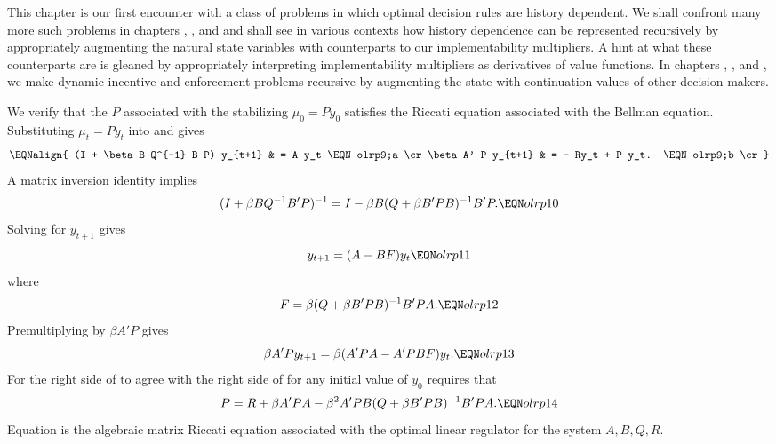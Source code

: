   This chapter is our first encounter with  a class of problems
in which optimal decision rules are history dependent. We shall
confront many more such problems in chapters ,
,
and  and shall see in various contexts how history
dependence can be represented recursively by
appropriately augmenting the natural state variables with
counterparts to our implementability multipliers.  A hint at what
these counterparts are is gleaned by appropriately interpreting
implementability multipliers as derivatives of value functions. In
chapters , , and , we make dynamic
incentive and enforcement problems recursive  by augmenting the
state with continuation values of other decision
makers.
%

\label{appAblkstack}%
We verify that the  $P$ associated with the stabilizing $\mu_0 = P
y_0$ satisfies the Riccati equation associated with the Bellman
equation. Substituting $\mu_t = P y_t$ into  and
 gives
$$\EQNalign{ (I + \beta   B   Q^{-1}   B P) y_{t+1}
   & = A y_t \EQN olrp9;a \cr
    \beta A' P y_{t+1} & = - Ry_t + P y_t. \EQN olrp9;b \cr } $$
A matrix inversion identity implies
$$ (I + \beta   B   Q^{-1}   B' P)^{-1}
  = I - \beta   B (  Q + \beta
    B' P   B)^{-1}   B' P .
  \EQN olrp10  $$
Solving  for $y_{t+1}$ gives
$$ y_{t+1} = (A -   B F) y_t \EQN olrp11 $$
where
$$ F = \beta (  Q + \beta   B' P   B)^{-1}   B' P A .\EQN olrp12 $$
Premultiplying  by $ \beta A' P$
gives
$$ \beta A' P y_{t+1} = \beta (A'PA - A' P   B F) y_t. \EQN olrp13 $$
For the right side of  to agree with
the right side of  for any initial value of
$y_0$ requires that
$$ P = R + \beta A'P A -\beta^2 A'P   B (  Q +  \beta   B' P
    B)^{-1}   B' P A. \EQN olrp14 $$
Equation  is the algebraic matrix Riccati equation
associated with the optimal linear regulator
for the system $A,   B, Q,   R$.

